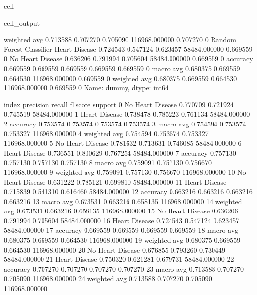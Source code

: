 \documentclass[letterpaper,10pt,english]{jupyterBook}
\begin{document}
\begin{sphinxuseclass}{cell}
\begin{sphinxVerbatimOutput}
\begin{sphinxuseclass}{cell_output}
\begin{sphinxVerbatim}[commandchars=\\\{\}]
                           weighted avg      0.713588   0.707270  0.705090  116968.000000  0.707270    0
Random Forest Classifier   Heart Disease     0.724543   0.547124  0.623457  58484.000000   0.669559    0
                           No Heart Disease  0.636206   0.791994  0.705604  58484.000000   0.669559    0
                           accuracy          0.669559   0.669559  0.669559  0.669559       0.669559    0
                           macro avg         0.680375   0.669559  0.664530  116968.000000  0.669559    0
                           weighted avg      0.680375   0.669559  0.664530  116968.000000  0.669559    0
Name: dummy, dtype: int64
\end{sphinxVerbatim}

\begin{sphinxVerbatim}[commandchars=\\\{\}]
               index  precision    recall  f1\PYGZhy{}score        support  \PYGZbs{}
0   No Heart Disease   0.770709  0.721924  0.745519   58484.000000   
1      Heart Disease   0.738478  0.785223  0.761134   58484.000000   
2           accuracy   0.753574  0.753574  0.753574       0.753574   
3          macro avg   0.754594  0.753574  0.753327  116968.000000   
4       weighted avg   0.754594  0.753574  0.753327  116968.000000   
5   No Heart Disease   0.781632  0.713631  0.746085   58484.000000   
6      Heart Disease   0.736551  0.800629  0.767254   58484.000000   
7           accuracy   0.757130  0.757130  0.757130       0.757130   
8          macro avg   0.759091  0.757130  0.756670  116968.000000   
9       weighted avg   0.759091  0.757130  0.756670  116968.000000   
10  No Heart Disease   0.631222  0.785121  0.699810   58484.000000   
11     Heart Disease   0.715839  0.541310  0.616460   58484.000000   
12          accuracy   0.663216  0.663216  0.663216       0.663216   
13         macro avg   0.673531  0.663216  0.658135  116968.000000   
14      weighted avg   0.673531  0.663216  0.658135  116968.000000   
15  No Heart Disease   0.636206  0.791994  0.705604   58484.000000   
16     Heart Disease   0.724543  0.547124  0.623457   58484.000000   
17          accuracy   0.669559  0.669559  0.669559       0.669559   
18         macro avg   0.680375  0.669559  0.664530  116968.000000   
19      weighted avg   0.680375  0.669559  0.664530  116968.000000   
20  No Heart Disease   0.676855  0.793260  0.730449   58484.000000   
21     Heart Disease   0.750320  0.621281  0.679731   58484.000000   
22          accuracy   0.707270  0.707270  0.707270       0.707270   
23         macro avg   0.713588  0.707270  0.705090  116968.000000   
24      weighted avg   0.713588  0.707270  0.705090  116968.000000   


\end{sphinxVerbatim}
\end{sphinxuseclass}
\end{sphinxVerbatimOutput}
\end{sphinxuseclass}
\end{document}
